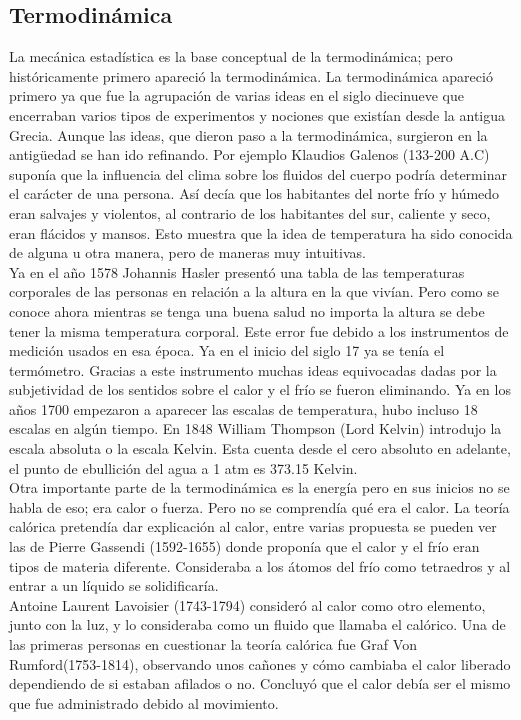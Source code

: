 \subsection{Termodinámica}
La mecánica estadística es la base conceptual de la termodinámica; pero históricamente primero apareció la termodinámica. La termodinámica apareció primero ya que fue la agrupación de varias ideas en el siglo diecinueve que encerraban varios tipos de experimentos  y nociones que existían desde la antigua Grecia. Aunque las ideas, que dieron paso a la termodinámica, surgieron en la antigüedad se han ido refinando. Por ejemplo Klaudios Galenos (133-200 A.C) suponía que la influencia del clima sobre los fluidos del cuerpo podría determinar el carácter de una persona. Así decía que los habitantes del norte frío y húmedo eran salvajes y violentos, al contrario de los habitantes del sur, caliente y seco, eran flácidos y mansos. Esto muestra que la idea de temperatura ha sido conocida de alguna u otra manera, pero de maneras muy intuitivas. 
\\
Ya en el año 1578  Johannis Hasler presentó una tabla de las temperaturas corporales de las personas en relación a la altura en la que vivían. Pero como se conoce ahora mientras se tenga una buena salud no importa la altura se debe tener la misma temperatura corporal. Este error fue debido a los instrumentos de medición usados en esa época. Ya en el inicio del siglo 17 ya se tenía el termómetro. Gracias a este instrumento muchas ideas equivocadas dadas por la subjetividad de los sentidos sobre el calor y el frío se fueron eliminando. Ya en los años 1700 empezaron a aparecer las escalas de temperatura, hubo incluso 18 escalas en algún tiempo. En 1848 William Thompson (Lord Kelvin)  introdujo la escala absoluta o la escala Kelvin. Esta cuenta desde el cero absoluto en adelante, el punto de ebullición del agua a  1 atm es 373.15 Kelvin.
\\
Otra importante parte de la termodinámica es la energía pero en sus inicios no se habla de eso; era calor o fuerza. Pero no se comprendía qué era el calor. La teoría calórica pretendía dar explicación al calor, entre varias propuesta se pueden ver las de Pierre Gassendi (1592-1655) donde proponía que el calor y el frío eran tipos de materia diferente. Consideraba a los átomos del frío como tetraedros y al entrar a un líquido se solidificaría.
\\
Antoine Laurent Lavoisier (1743-1794) consideró al calor como otro elemento, junto con la luz, y lo consideraba como un fluido que llamaba el calórico. Una de las primeras personas en cuestionar la teoría calórica fue Graf Von Rumford(1753-1814), observando unos cañones y cómo cambiaba el calor liberado dependiendo de si estaban afilados  o no. Concluyó que el calor debía ser el mismo que fue administrado debido al movimiento.
